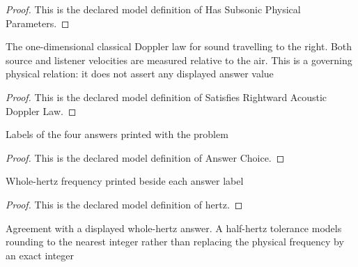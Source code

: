 \begin{proof}
  This is the declared model definition of Has Subsonic Physical Parameters.
\end{proof}
\begin{definition}
  \label{def:physics:phyx-mini-0171:phyxminiproblems-problemphyxmini0171-satisfiesrightwardacousticdopplerlaw}
  The one-dimensional classical Doppler law for sound travelling to the right. Both source and listener velocities are measured relative to the air. This is a governing physical relation: it does not assert any displayed answer value
\end{definition}
\begin{proof}
  This is the declared model definition of Satisfies Rightward Acoustic Doppler Law.
\end{proof}
\begin{definition}
  \label{def:physics:phyx-mini-0171:phyxminiproblems-problemphyxmini0171-answerchoice}
  Labels of the four answers printed with the problem
\end{definition}
\begin{proof}
  This is the declared model definition of Answer Choice.
\end{proof}
\begin{definition}[hertz]
  \label{def:physics:phyx-mini-0171:phyxminiproblems-problemphyxmini0171-answerchoice-hertz}
  Whole-hertz frequency printed beside each answer label
\end{definition}
\begin{proof}
  This is the declared model definition of hertz.
\end{proof}
\begin{definition}
  \label{def:physics:phyx-mini-0171:phyxminiproblems-problemphyxmini0171-matchesanswerchoice}
  Agreement with a displayed whole-hertz answer. A half-hertz tolerance models rounding to the nearest integer rather than replacing the physical frequency by an exact integer
\end{definition}
